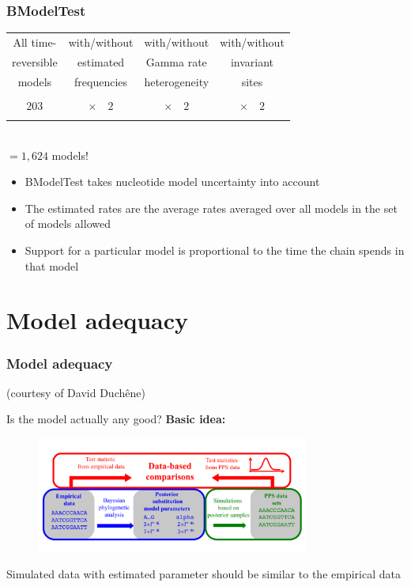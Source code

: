 \begin{frame}\frametitle{BModelTest}

    \begin{tabular}{cccc}
      All time-  & with/without  &  with/without & with/without   \\
      reversible  &  estimated &   Gamma rate &  invariant   \\
      models  & frequencies &  heterogeneity & sites \\
      & & &  \\
      $203$ & $ \times \quad 2$  & $\times \quad 2$ & $\times \quad 2 $ \\
      & & & \\
    \end{tabular}
    \\
    $= 1,624$ models! 


    \pause
    \vspace{1cm}
    \begin{itemize}
        \item BModelTest takes nucleotide model uncertainty into account
        \item The estimated rates are the average rates averaged over all models in the set of models allowed
        \item Support for a particular model is proportional to the time the chain spends in that model
    \end{itemize}

\end{frame}


\section{Model adequacy}

\begin{frame}\frametitle{Model adequacy}
\small{(courtesy of David Duch\^{e}ne)}

  \vspace{1cm}
  Is the model actually any good?
  \vspace{0.5cm}
  \pause
  \textbf{Basic idea:}
  \begin{figure}
      \includegraphics[width=0.8\textwidth]{figures/Adequacy}
  \end{figure}
  Simulated data with estimated parameter should be similar to the empirical data



\end{frame}
